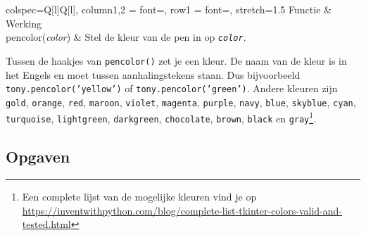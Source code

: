 \documentclass[../main]{subfiles}
\begin{document}
\begin{table}[ht]
    \centering
    \begin{tblr}{
        colspec={Q[l]Q[l]},
        column{1,2} = {font=\ttfamily},
        row{1} = {font=\sffamily\bfseries},
        stretch=1.5}
        \topline
        Functie & Werking\\
        pencolor(\textit{color}) & Stel de kleur van de pen in op \textit{\texttt{color}}.\\
        \bottomline
    \end{tblr}
    \caption{Instelling van de penkleur}%
    \label{tbl:pen-kleur}
\end{table}

Tussen de haakjes van \texttt{pencolor()} zet je een kleur. De naam van de kleur is in het Engels en moet tussen aanhalingstekens staan. Dus bijvoorbeeld \texttt{tony.pencolor('yellow')} of \texttt{tony.pencolor('green')}. Andere kleuren zijn \texttt{gold}, \texttt{orange}, \texttt{red}, \texttt{maroon}, \texttt{violet}, \texttt{magenta}, \texttt{purple}, \texttt{navy}, \texttt{blue}, \texttt{skyblue}, \texttt{cyan}, \texttt{turquoise}, \texttt{lightgreen}, \texttt{darkgreen}, \texttt{chocolate}, \texttt{brown}, \texttt{black} en \texttt{gray}\footnote{Een complete lijst van de mogelijke kleuren vind je op \url{https://inventwithpython.com/blog/complete-list-tkinter-colors-valid-and-tested.html}}.
\subsection*{Opgaven}
\end{document}
